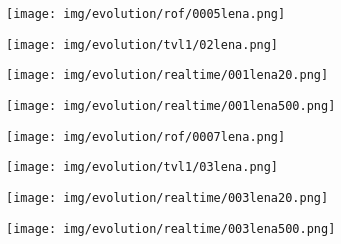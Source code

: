 \begin{figure}[ht]
    \centering
    \begin{center}
        \begin{subfigure}[b]{0.19\textwidth}
            \texttt{[image: img/evolution/rof/0005lena.png]}
        \end{subfigure}
        \begin{subfigure}[b]{0.19\textwidth}
            \texttt{[image: img/evolution/tvl1/02lena.png]}
        \end{subfigure}
        \begin{subfigure}[b]{0.19\textwidth}
            \texttt{[image: img/evolution/realtime/001lena20.png]}
        \end{subfigure}
        \begin{subfigure}[b]{0.19\textwidth}
            \texttt{[image: img/evolution/realtime/001lena500.png]}
        \end{subfigure}
    \end{center}
    \begin{center}
        \begin{subfigure}[b]{0.19\textwidth}
            \texttt{[image: img/evolution/rof/0007lena.png]}
        \end{subfigure}
        \begin{subfigure}[b]{0.19\textwidth}
            \texttt{[image: img/evolution/tvl1/03lena.png]}
        \end{subfigure}
        \begin{subfigure}[b]{0.19\textwidth}
            \texttt{[image: img/evolution/realtime/003lena20.png]}
        \end{subfigure}
        \begin{subfigure}[b]{0.19\textwidth}
            \texttt{[image: img/evolution/realtime/003lena500.png]}
        \end{subfigure}
    \end{center}
    \begin{center}
        \begin{subfigure}[b]{0.19\textwidth}

\end{subfigure}
\end{center}
\end{figure}
